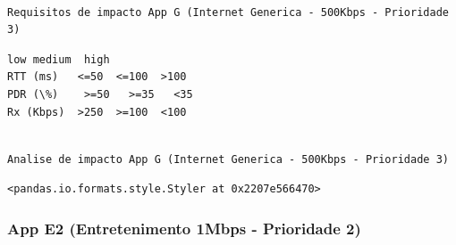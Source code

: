 \documentclass[11pt]{article}
\begin{document}
    \begin{Verbatim}[commandchars=\\\{\}]

Requisitos de impacto App G (Internet Generica - 500Kbps - Prioridade 3)

    \end{Verbatim}

    
    \begin{Verbatim}[commandchars=\\\{\}]
            low medium  high
RTT (ms)   <=50  <=100  >100
PDR (\%)    >=50   >=35   <35
Rx (Kbps)  >250  >=100  <100
    \end{Verbatim}

    
    \begin{Verbatim}[commandchars=\\\{\}]

Analise de impacto App G (Internet Generica - 500Kbps - Prioridade 3)

    \end{Verbatim}

    
    \begin{Verbatim}[commandchars=\\\{\}]
<pandas.io.formats.style.Styler at 0x2207e566470>
    \end{Verbatim}

    
    \hypertarget{app-e2-entretenimento-1mbps---prioridade-2}{%
\subsubsection{App E2 (Entretenimento 1Mbps - Prioridade
2)}\label{app-e2-entretenimento-1mbps---prioridade-2}}
\end{document}
